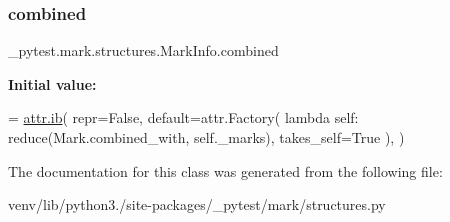 \subsubsection{\texorpdfstring{combined}{combined}}
{\footnotesize\ttfamily \+\_\+pytest.\+mark.\+structures.\+Mark\+Info.\+combined\hspace{0.3cm}{\ttfamily [static]}}

{\bfseries Initial value\+:}
\begin{DoxyCode}
=  \hyperlink{attr_2____init_____8py_a2799a60f81b3e70456d382bab67d82d0}{attr.ib}(
        repr=\textcolor{keyword}{False},
        default=attr.Factory(
            \textcolor{keyword}{lambda} self: reduce(Mark.combined\_with, self.\_marks), takes\_self=\textcolor{keyword}{True}
        ),
    )
\end{DoxyCode}


The documentation for this class was generated from the following file\+:\begin{DoxyCompactItemize}
\item 
venv/lib/python3./site-\/packages/\+\_\+pytest/mark/structures.\+py\end{DoxyCompactItemize}
